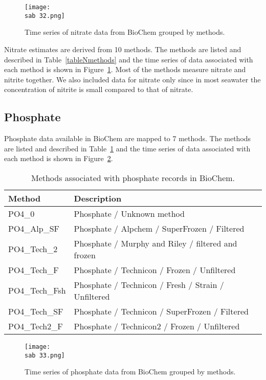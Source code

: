 \documentclass[letterpaper,portrait,11pt]{scrartcl}
\numberwithin{equation}{section}		%
\numberwithin{figure}{section}			%
\numberwithin{table}{section}				%
\newcommand{\ecomod}{\string~/ecomod_data/}   %
\newcommand{\sab}{\ecomod/mpa/sab/}   %
\begin{document}
\begin{itemize*}
\begin{appendices}
\begin{figure}[h]
  \centering
  \texttt{[image: \\sab 32.png]}
  \caption{Time series of nitrate data from BioChem grouped by methods.}
  \label{figNTimeseries}
\end{figure}

Nitrate estimates are derived from 10 methods. The methods are listed and described in Table~\ref{tableNmethods} and the time series of data associated with each method is shown in Figure~\ref{figNTimeseries}. Most of the methods measure nitrate and nitrite together. We also included data for nitrate only since  in most seawater the concentration of nitrite is small compared to that of nitrate.


\subsection{Phosphate}

Phosphate  data available in BioChem are mapped to 7 methods. The methods are listed and described in Table~\ref{tablePhosphateMethods} and the time series of data associated with each method is shown in Figure~\ref{figPhosphateTimeseries}.

\begin{table}[h]
  \caption{Methods associated with phosphate records in BioChem.}
  \label{tablePhosphateMethods}
  \begin{tabular}{ll}
    Method & Description \\ \hline
    PO4\_0 & Phosphate / Unknown method  \\ 
    PO4\_Alp\_SF & Phosphate / Alpchem / SuperFrozen / Filtered \\ 
    PO4\_Tech\_2 & Phosphate / Murphy and Riley / filtered and frozen \\ 
    PO4\_Tech\_F & Phosphate / Technicon / Frozen / Unfiltered \\ 
    PO4\_Tech\_Fsh & Phosphate / Technicon / Fresh / Strain / Unfiltered \\
    PO4\_Tech\_SF & Phosphate / Technicon / SuperFrozen / Filtered \\
    PO4\_Tech2\_F & Phosphate / Technicon2 / Frozen / Unfiltered \\
  \end{tabular}
\end{table}


\begin{figure}[h]
  \centering
  \texttt{[image: \\sab 33.png]}
  \caption{Time series of phosphate data from BioChem grouped by methods.}
  \label{figPhosphateTimeseries}
\end{figure}




\end{appendices}
\end{itemize*}
\end{document}
